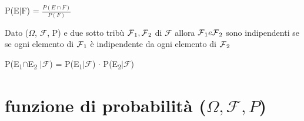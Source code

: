 \documentclass[12pt, a4paper]{article}
\def\SB#1{\textsubscript{#1}}
\begin{document}
\begin{center}
    P(E$|$F) = $\frac{P(E\cap F)}{P(F)}$
\end{center}


Dato ($\Omega$, $\mathcal{F}$, P) e due sotto tribù $\mathcal{F}\SB{1},\mathcal{F}\SB{2}$ di $\mathcal{F}$
allora $\mathcal{F}\SB{1}e\mathcal{F}\SB{2}$ sono indipendenti se se ogni elemento di $\mathcal{F}\SB{1}$ è indipendente
da ogni elemento di $\mathcal{F}\SB{2}$
\begin{center}
P(E\SB{1}$\cap$E\SB{2} $\vert\mathcal{F}$) = P(E\SB{1}$\vert\mathcal{F}$) $\cdot$ P(E\SB{2}$\vert\mathcal{F}$)    
\end{center}

\clearpage
\section{funzione di probabilità ($\Omega,\mathcal{F},P$)}
\end{document}
